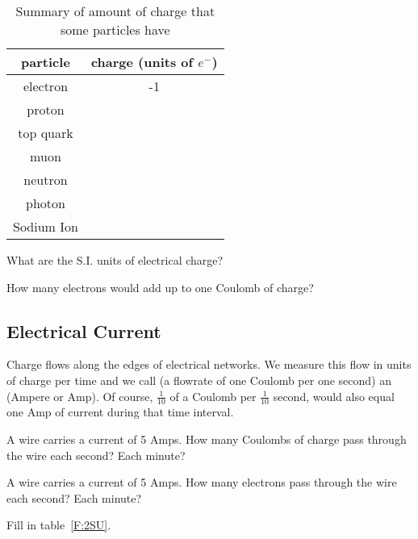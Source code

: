 \par
\begin{table}[H]
\begin{center}
\begin{tabular}{|c|c|} \hline
particle	&	charge (units of $e^-$) \\ \hline
electron	&	-1\\ \hline
proton		&	\\ \hline
top quark	&	\\ \hline
muon		&	\\ \hline
neutron		&	\\ \hline
photon		&	\\ \hline
Sodium Ion	&	\\ \hline
\end{tabular}
\caption{Summary of amount of charge that some particles have}
\label{T:2EP}
\end{center}
\end{table}

\begin{alevel}
What are the S.I. units of electrical charge?
\end{alevel}

\begin{blevel}
How many electrons would add up to one Coulomb of charge?
\end{blevel}

\subsection{Electrical Current}
Charge flows along the edges of electrical networks. We measure this flow in units of charge per time and we call (a flowrate of one Coulomb per one second) an (Ampere or Amp). Of course, $\frac{1}{10}$ of a Coulomb per $\frac{1}{10}$ second, would also equal one Amp of current during that time interval.
\par
\begin{alevel}
A wire carries a current of 5 Amps. How many Coulombs of charge pass through the wire each second? Each minute?
\end{alevel}

\begin{blevel}
A wire carries a current of 5 Amps. How many electrons pass through the wire each second? Each minute?
\end{blevel}

\begin{blevel}
Fill in table~\ref{F:2SU}.
\end{blevel}

